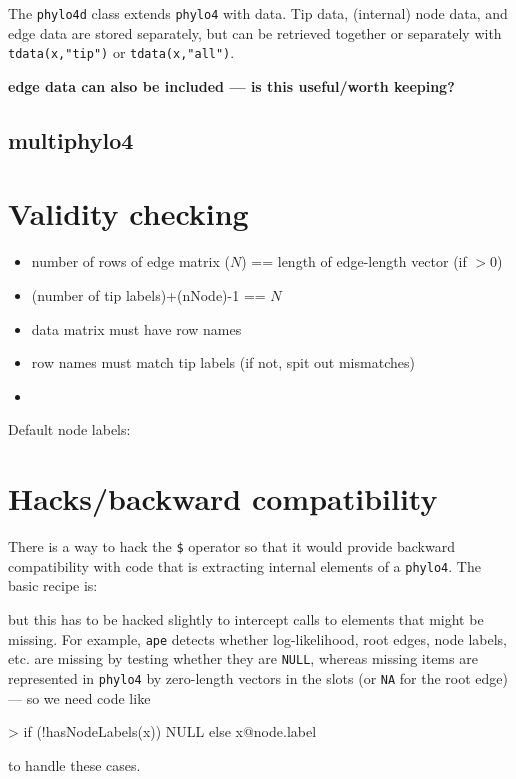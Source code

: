 \documentclass{article}
\newcommand{\code}[1]{{{\tt #1}}}
\begin{document}
The \code{phylo4d} class extends \code{phylo4} with data.  Tip data, (internal) node data, and edge data are stored separately, but can be retrieved together or separately with \code{tdata(x,"tip")} or \code{tdata(x,"all")}.

\textbf{edge data can also be included --- is this
useful/worth keeping?}

\subsection{multiphylo4}

\section{Validity checking}

\begin{itemize}
\item number of rows of edge matrix ($N$) == length of edge-length vector (if $>0$)
\item (number of tip labels)+(nNode)-1 == $N$
\item data matrix must have row names
\item row names must match tip labels (if not, spit out mismatches)
\item 
\end{itemize}
 
Default node labels:

\section{Hacks/backward compatibility}

There is a way to hack the \verb+$+ operator so that it would provide backward compatibility with code that is extracting internal elements of a \code{phylo4}. The basic recipe is: 

\begin{Schunk}
\end{Schunk}

but this has to be hacked slightly to intercept calls to elements that might be missing.  For example, \code{ape} detects whether log-likelihood, root edges, node labels, etc. are missing by testing whether they are \code{NULL}, whereas missing items are represented in \code{phylo4} by zero-length vectors in the slots (or \code{NA} for the root edge) --- so we need code like 
\begin{Schunk}
\begin{Sinput}
> if (!hasNodeLabels(x)) NULL else x@node.label
\end{Sinput}
\end{Schunk}
to handle these cases.
\end{document}
